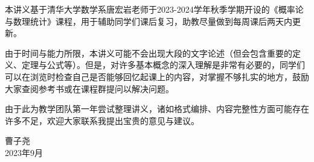 \documentclass[main.tex]{subfiles}
\begin{document}
本讲义基于清华大学数学系唐宏岩老师于2023-2024学年秋季学期开设的《概率论与数理统计》课程，用于辅助同学们课后复习，助教尽量做到每周课后两天内更新。

由于时间与能力所限，本讲义可能不会出现大段的文字论述（但会包含重要的定义、定理与公式等）。但是，对许多基本概念的深入理解是非常有必要的，同学们可以在浏览时检查自己是否能够回忆起课上的内容，对掌握不够扎实的地方，鼓励大家查阅参考书或在课程群提问以解决问题。

由于此为教学团队第一年尝试整理讲义，诸如格式编排、内容完整性方面可能存在许多不足，欢迎大家联系我提出宝贵的意见与建议。

\begin{flushright}
曹子尧\\
2023年9月
\end{flushright}
\end{document}
